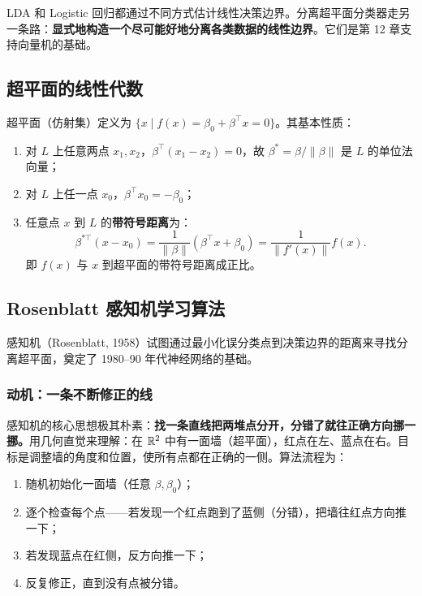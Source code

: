 LDA 和 Logistic 回归都通过不同方式估计线性决策边界。分离超平面分类器走另一条路：\textbf{显式地构造一个尽可能好地分离各类数据的线性边界}。它们是第 12 章支持向量机的基础。

\subsection{超平面的线性代数}

超平面（仿射集）定义为 $\{x \mid f(x) = \beta_0 + \beta^\top x = 0\}$。其基本性质：

\begin{enumerate}[label=(\arabic*)]
    \item 对 $L$ 上任意两点 $x_1, x_2$，$\beta^\top(x_1 - x_2) = 0$，故 $\beta^* = \beta / \|\beta\|$ 是 $L$ 的单位法向量；
    \item 对 $L$ 上任一点 $x_0$，$\beta^\top x_0 = -\beta_0$；
    \item 任意点 $x$ 到 $L$ 的\textbf{带符号距离}为：
    \begin{equation}\label{eq:signed_distance}
        \beta^{*\top}(x - x_0) = \frac{1}{\|\beta\|}(\beta^\top x + \beta_0) = \frac{1}{\|f'(x)\|} f(x).
    \end{equation}
    即 $f(x)$ 与 $x$ 到超平面的带符号距离成正比。
\end{enumerate}


\subsection{Rosenblatt 感知机学习算法}

感知机（Rosenblatt, 1958）试图通过最小化误分类点到决策边界的距离来寻找分离超平面，奠定了 1980--90 年代神经网络的基础。

\subsubsection{动机：一条不断修正的线}

感知机的核心思想极其朴素：\textbf{找一条直线把两堆点分开，分错了就往正确方向挪一挪。}用几何直觉来理解：在 $\mathbb{R}^2$ 中有一面墙（超平面），红点在左、蓝点在右。目标是调整墙的角度和位置，使所有点都在正确的一侧。算法流程为：

\begin{enumerate}[label=(\arabic*)]
    \item 随机初始化一面墙（任意 $\beta, \beta_0$）；
    \item 逐个检查每个点——若发现一个红点跑到了蓝侧（分错），把墙往红点方向推一下；
    \item 若发现蓝点在红侧，反方向推一下；
    \item 反复修正，直到没有点被分错。
\end{enumerate}

